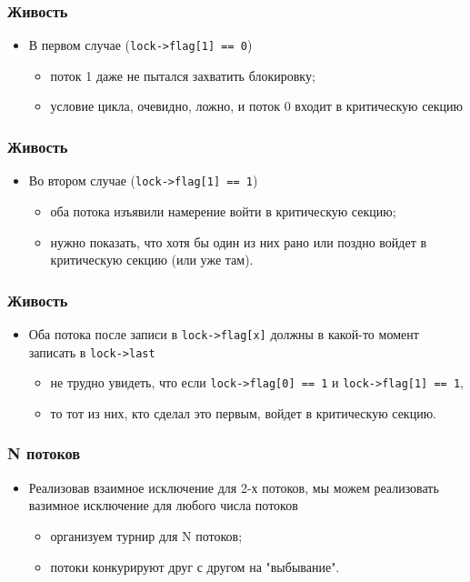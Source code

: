 \begin{frame}
\frametitle{Живость}
\begin{itemize}
    \item<1->В первом случае (\lstinline|lock->flag[1] == 0|)
    \begin{itemize}
        \item<2->поток 1 даже не пытался захватить блокировку;
        \item<3->условие цикла, очевидно, ложно, и поток 0 входит в
             критическую секцию
    \end{itemize}
\end{itemize}
\end{frame}

\begin{frame}
\frametitle{Живость}
\begin{itemize}
    \item<1->Во втором случае (\lstinline|lock->flag[1] == 1|)
    \begin{itemize}
        \item<2->оба потока изъявили намерение войти в критическую секцию;
        \item<3->нужно показать, что хотя бы один из них рано или поздно
             войдет в критическую секцию (или уже там).
    \end{itemize}
\end{itemize}
\end{frame}

\begin{frame}
\frametitle{Живость}
\begin{itemize}
    \item<1->Оба потока после записи в \lstinline|lock->flag[x]| должны в
         какой-то момент записать в \lstinline|lock->last|
    \begin{itemize}
        \item<2->не трудно увидеть, что если \lstinline|lock->flag[0] == 1| и
             \lstinline|lock->flag[1] == 1|,
        \item<2->то тот из них, кто сделал это первым, войдет в критическую
             секцию.
    \end{itemize}
\end{itemize}
\end{frame}


\begin{frame}
\frametitle{N потоков}
\begin{itemize}
    \item<1->Реализовав взаимное исключение для 2-х потоков, мы можем
         реализовать вазимное исключение для любого числа потоков
    \begin{itemize}
        \item<2->организуем турнир для N потоков;
        \item<3->потоки конкурируют друг с другом на "выбывание".
    \end{itemize}
\end{itemize}
\end{frame}

